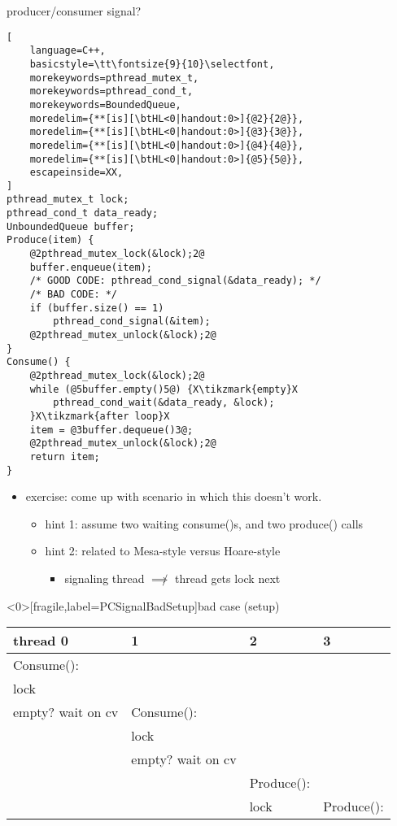 \begin{frame}[fragile,label=PCSignal]{producer/consumer signal?}
\begin{lstlisting}[
    language=C++,
    basicstyle=\tt\fontsize{9}{10}\selectfont,
    morekeywords=pthread_mutex_t,
    morekeywords=pthread_cond_t,
    morekeywords=BoundedQueue,
    moredelim={**[is][\btHL<0|handout:0>]{@2}{2@}}, 
    moredelim={**[is][\btHL<0|handout:0>]{@3}{3@}}, 
    moredelim={**[is][\btHL<0|handout:0>]{@4}{4@}}, 
    moredelim={**[is][\btHL<0|handout:0>]{@5}{5@}}, 
    escapeinside=XX,
]
pthread_mutex_t lock;
pthread_cond_t data_ready;
UnboundedQueue buffer;
Produce(item) {
    @2pthread_mutex_lock(&lock);2@
    buffer.enqueue(item);
    /* GOOD CODE: pthread_cond_signal(&data_ready); */
    /* BAD CODE: */
    if (buffer.size() == 1)
        pthread_cond_signal(&item);
    @2pthread_mutex_unlock(&lock);2@
}
Consume() {
    @2pthread_mutex_lock(&lock);2@
    while (@5buffer.empty()5@) {X\tikzmark{empty}X
        pthread_cond_wait(&data_ready, &lock);
    }X\tikzmark{after loop}X
    item = @3buffer.dequeue()3@;
    @2pthread_mutex_unlock(&lock);2@
    return item;
}
\end{lstlisting}
\begin{itemize}
    \item exercise: come up with scenario in which this doesn't work.
        \begin{itemize}
        \item hint 1: assume two waiting consume()s, and two produce() calls
        \item hint 2: related to Mesa-style versus Hoare-style 
            \begin{itemize}
            \item signaling thread $\not\implies$ thread gets lock next
            \end{itemize}
        \end{itemize}
\end{itemize}
\end{frame}

\begin{frame}<0>[fragile,label=PCSignalBadSetup]{bad case (setup)}
\fontsize{12}{13}\selectfont
\begin{tabular}{l|l|l|l}
thread 0 & 1 & 2 & 3 \\ \hline
Consume(): & & \\
lock & & \\
empty? wait on cv & Consume(): \\
     & lock & \\
     & empty? wait on cv & & \\
     & & Produce(): & \\
     & & lock & Produce(): \\
\end{tabular}
\end{frame}

